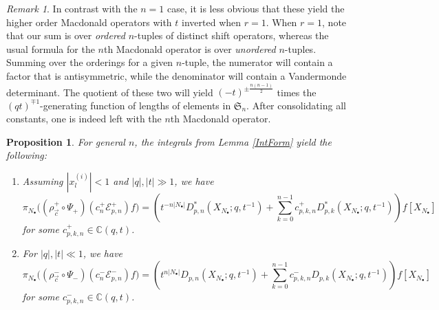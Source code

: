 \documentclass{amsart}
\newcommand{\C}{\mathbb{C}}
\newcommand{\Sym}{\mathfrak{S}}
\newtheorem{prop}[thm]{Proposition}
\theoremstyle{remark}
\newtheorem{rem}[thm]{Remark}
\numberwithin{thm}{section}
\numberwithin{equation}{section}
\begin{document}
\begin{rem}\label{MacCompare}
In contrast with the $n=1$ case, it is less obvious that these yield the higher order Macdonald operators with $t$ inverted when $r=1$.
When $r=1$, note that our sum is over \textit{ordered} $n$-tuples of distinct shift operators, whereas the usual formula for the $n$th Macdonald operator is over \textit{unordered} $n$-tuples.
Summing over the orderings for a given $n$-tuple, the numerator will contain a factor that is antisymmetric, while the denominator will contain a Vandermonde determinant.
The quotient of these two will yield $(-t)^{\pm \frac{n(n-1)}{2}}$ times the $(qt)^{\mp 1}$-generating function of lengths of elements in $\Sym_n$.
After consolidating all constants, one is indeed left with the $n$th Macdonald operator.
\end{rem}

\begin{prop}\label{ResidueCalc}
For general $n$, the integrals from Lemma \ref{IntForm} yield the following:
\begin{enumerate}
\item[$(+)$]
Assuming $|x^{(i)}_{l}|<1$ and $|q|,|t|\gg 1$, we have
\[
\pi_{N_\bullet}\biggl( (\rho_{\vec{c}}^+\circ\Psi_+)(c^+_n\mathcal{E}_{p,n}^+)f\biggr)
= \left(t^{-n|N_\bullet|}D_{p,n}^*(X_{N_\bullet}; q,t^{-1})+\sum_{k=0}^{n-1}c_{p,k,n}^+ D_{p,k}^*(X_{N_\bullet}; q,t^{-1}) \right)f\left[ X_{N_\bullet} \right]
\]
for some $c_{p,k,n}^+\in\C(q,t)$.
\item[$(-)$]
For $|q|,|t|\ll 1$, we have
\[
\pi_{N_\bullet}\biggl( (\rho_{\vec{c}}^-\circ\Psi_-)(c^-_n\mathcal{E}_{p,n}^-)f\biggr)
=\left(t^{n|N_\bullet|}D_{p,n}(X_{N_\bullet};q,t^{-1}) +\sum_{k=0}^{n-1}c_{p,k,n}^-D_{p,k}(X_{N_\bullet};q,t^{-1})\right)f\left[ X_{N_\bullet} \right]
\]
for some $c_{p,k,n}^-\in\C(q,t)$.
\end{enumerate}
\end{prop}
\end{document}
